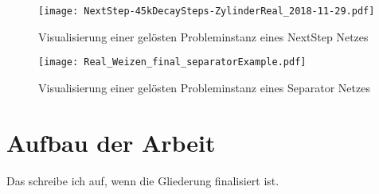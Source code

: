 \begin{figure}[h]
    \centering
    \texttt{[image: NextStep-45kDecaySteps-ZylinderReal\_2018-11-29.pdf]}
    \caption{Visualisierung einer gelösten Probleminstanz eines NextStep Netzes}
    \label{fig:visualsNextstep}
\end{figure}


\begin{figure}[h]
    \centering
	\texttt{[image: Real\_Weizen\_final\_separatorExample.pdf]}
	\caption{Visualisierung einer gelösten Probleminstanz eines Separator Netzes}
	\label{fig:visualsSeparator}
\end{figure}



\section{Aufbau der Arbeit}

Das schreibe ich auf, wenn die Gliederung finalisiert ist.


